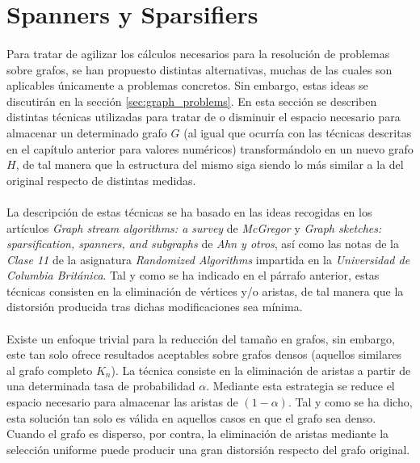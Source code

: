 \documentclass{subfiles}
\begin{document}
    \section{Spanners y Sparsifiers}
    \label{sec:spanners_sparsifiers}

      \paragraph{}
      Para tratar de agilizar los cálculos necesarios para la resolución de problemas sobre grafos, se han propuesto distintas alternativas, muchas de las cuales son aplicables únicamente a problemas concretos. Sin embargo, estas ideas se discutirán en la sección \ref{sec:graph_problems}. En esta sección se describen distintas técnicas utilizadas para tratar de  o disminuir el espacio necesario para almacenar un determinado grafo $G$ (al igual que ocurría con las técnicas descritas en el capítulo anterior para valores numéricos) transformándolo en un nuevo grafo $H$, de tal manera que la estructura del mismo siga siendo lo más similar a la del original respecto de distintas medidas.

      \paragraph{}
      La descripción de estas técnicas se ha basado en las ideas recogidas en los artículos \emph{Graph stream algorithms: a survey} \cite{mcgregor2014graph} de \emph{McGregor} y \emph{Graph sketches: sparsification, spanners, and subgraphs} \cite{ahn2012graph} de \emph{Ahn y otros}, así como las notas de la \emph{Clase 11} de la asignatura \emph{Randomized Algorithms} \cite{harvey2011randomized} impartida en la \emph{Universidad de Columbia Británica}. Tal y como se ha indicado en el párrafo anterior, estas técnicas consisten en la eliminación de vértices y/o aristas, de tal manera que la distorsión producida tras dichas modificaciones sea mínima.

      \paragraph{}
      Existe un enfoque trivial para la reducción del tamaño en grafos, sin embargo, este tan solo ofrece resultados aceptables sobre grafos densos (aquellos similares al grafo completo $K_n$). La técnica consiste en la eliminación de aristas a partir de una determinada tasa de probabilidad $\alpha$. Mediante esta estrategia se reduce el espacio necesario para almacenar las aristas de $(1-\alpha)$. Tal y como se ha dicho, esta solución tan solo es válida en aquellos casos en que el grafo sea denso. Cuando el grafo es disperso, por contra, la eliminación de aristas mediante la selección uniforme puede producir una gran distorsión respecto del grafo original.
\end{document}
